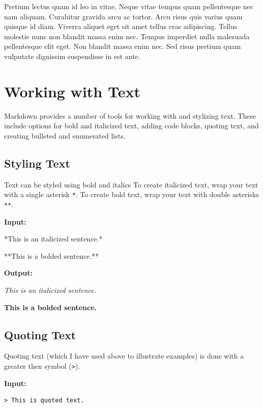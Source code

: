 \documentclass[]{book}
\newenvironment{Shaded}{\begin{snugshade}}{\end{snugshade}}
\newcommand{\NormalTok}[1]{#1}
\theoremstyle{definition}
\theoremstyle{definition}
\theoremstyle{definition}
\theoremstyle{remark}
\begin{document}
Pretium lectus quam id leo in vitae. Neque vitae tempus quam
pellentesque nec nam aliquam. Curabitur gravida arcu ac tortor. Arcu
risus quis varius quam quisque id diam. Viverra aliquet eget sit amet
tellus cras adipiscing. Tellus molestie nunc non blandit massa enim nec.
Tempus imperdiet nulla malesuada pellentesque elit eget. Non blandit
massa enim nec. Sed risus pretium quam vulputate dignissim suspendisse
in est ante.

\section{Working with Text}\label{working-with-text}

Markdown provides a number of tools for working with and stylizing text.
These include options for bold and italicized text, adding code blocks,
quoting text, and creating bulleted and enumerated lists.

\subsection{Styling Text}\label{styling-text}

Text can be styled using bold and italics To create italicized text,
wrap your text with a single asterisk \texttt{*}. To create bold text,
wrap your text with double asterisks \texttt{**}.

\textbf{Input:}

\begin{Shaded}
\begin{Highlighting}[]
\NormalTok{*This is an italicized sentence.*}

\NormalTok{**This is a bolded sentence.**}
\end{Highlighting}
\end{Shaded}

\textbf{Output:}

\emph{This is an italicized sentence.}

\textbf{This is a bolded sentence.}

\subsection{Quoting Text}\label{quoting-text}

Quoting text (which I have used above to illustrate examples) is done
with a greater then symbol (\texttt{\textgreater{}}).

\textbf{Input:}

\begin{verbatim}
> This is quoted text.
\end{verbatim}
\end{document}
